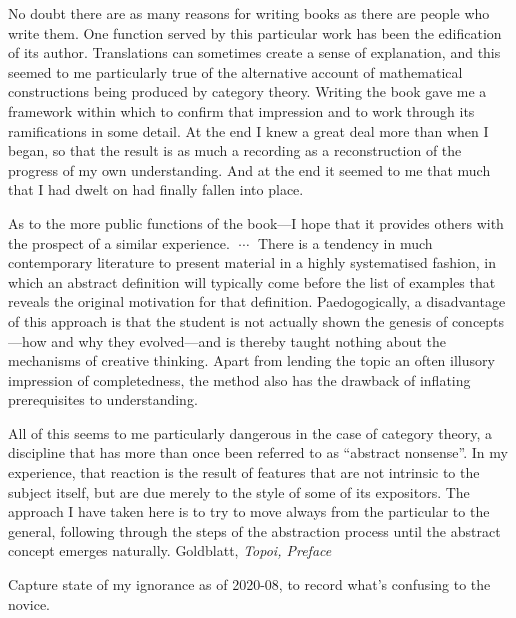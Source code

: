 \documentclass[11pt,openany]{book}
\begin{document}
\begin{boxquote}
No doubt there are as many reasons for writing books as there are people
who write them. One function served by this particular work has been the
edification of its author. Translations can sometimes create a sense of
explanation, and this seemed to me particularly true of the alternative
account of mathematical constructions being produced by category
theory. Writing the book gave me a framework within which to confirm
that impression and to work through its ramifications in some detail. At
the end I knew a great deal more than when I began, so that the result is
as much a recording as a reconstruction of the progress of my own
understanding. And at the end it seemed to me that much that I had
dwelt on had finally fallen into place.
\par
As to the more public functions of the book---I hope that it provides
others with the prospect of a similar experience. 
$\;\cdots\;$ 
There is a tendency in much contemporary literature to present material
in a highly systematised fashion, in which an abstract definition will
typically come before the list of examples that reveals the original
motivation for that definition. Paedogogically, a disadvantage of this
approach is that the student is not actually shown the genesis of 
concepts---how and why they evolved---and 
is thereby taught nothing about the
mechanisms of creative thinking. Apart from lending the topic an often
illusory impression of completedness, the method also has the drawback
of inflating prerequisites to understanding.
\par
All of this seems to me particularly dangerous in the case of category
theory, a discipline that has more than once been referred to as ``abstract
nonsense''. In my experience, that reaction is the result of features that
are not intrinsic to the subject itself, but are due merely to the style of
some of its expositors. The approach I have taken here is to try to move
always from the particular to the general, following through the steps of
the abstraction process until the abstract concept emerges naturally. 
\tcblower
{Goldblatt, \textit{Topoi, Preface}~\cite{goldblatt_1984_topoi}}
\end{boxquote}
Capture state of my ignorance as of 2020-08,
to record what's confusing to the novice.
\end{document}

